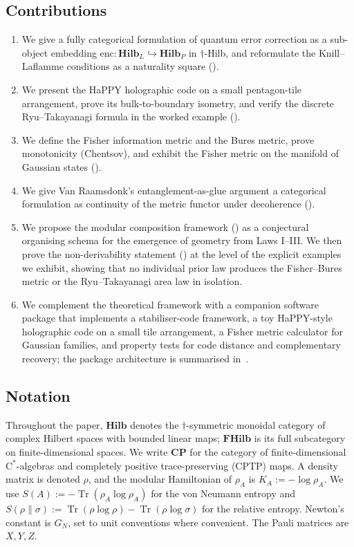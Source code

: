 \documentclass[12pt]{article}
\theoremstyle{definition}
\theoremstyle{remark}
\newcommand{\Hilb}{\mathbf{Hilb}}
\newcommand{\FHilb}{\mathbf{FHilb}}
\newcommand{\CP}{\mathbf{CP}}
\newcommand{\enc}{\mathrm{enc}}
\newcommand{\Tr}{\operatorname{Tr}}
\begin{document}
\subsection{Contributions}
\label{sec:contributions}

\begin{enumerate}
  \item We give a fully categorical formulation of quantum error correction as a sub-object embedding $\enc\colon \Hilb_L \hookrightarrow \Hilb_P$ in $\dagger$-Hilb, and reformulate the Knill--Laflamme conditions as a naturality square ().
  \item We present the HaPPY holographic code on a small pentagon-tile arrangement, prove its bulk-to-boundary isometry, and verify the discrete Ryu--Takayanagi formula in the worked example ().
  \item We define the Fisher information metric and the Bures metric, prove monotonicity (Chentsov), and exhibit the Fisher metric on the manifold of Gaussian states ().
  \item We give Van Raamsdonk's entanglement-as-glue argument a categorical formulation as continuity of the metric functor under decoherence ().
  \item We propose the modular composition framework () as a conjectural organising schema for the emergence of geometry from Laws I--III. We then prove the non-derivability statement () at the level of the explicit examples we exhibit, showing that no individual prior law produces the Fisher--Bures metric or the Ryu--Takayanagi area law in isolation.
  \item We complement the theoretical framework with a companion software package that implements a stabiliser-code framework, a toy HaPPY-style holographic code on a small tile arrangement, a Fisher metric calculator for Gaussian families, and property tests for code distance and complementary recovery; the package architecture is summarised in~.
\end{enumerate}

\subsection{Notation}
\label{sec:notation}

Throughout the paper, $\Hilb$ denotes the $\dagger$-symmetric monoidal category of complex Hilbert spaces with bounded linear maps; $\FHilb$ is its full subcategory on finite-dimensional spaces. We write $\CP$ for the category of finite-dimensional $\mathrm{C}^\ast$-algebras and completely positive trace-preserving (CPTP) maps. A density matrix is denoted $\rho$, and the modular Hamiltonian of $\rho_A$ is $K_A := -\log \rho_A$. We use $S(A) := -\Tr(\rho_A \log \rho_A)$ for the von Neumann entropy and $S(\rho \| \sigma) := \Tr(\rho \log \rho) - \Tr(\rho \log \sigma)$ for the relative entropy. Newton's constant is $G_N$, set to unit conventions where convenient. The Pauli matrices are $X,Y,Z$.
\end{document}
